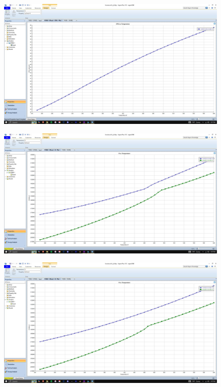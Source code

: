 \documentclass{article}
\begin{document}
\begin{figure}[H]
    \centering
    \includegraphics[width=0.99\textwidth, frame]{img/4.JPG}
\end{figure}

\begin{figure}[H]
    \centering
    \includegraphics[width=0.99\textwidth, frame]{img/5.JPG}
\end{figure}

\begin{figure}[H]
    \centering
    \includegraphics[width=0.99\textwidth, frame]{img/6.JPG}
\end{figure}
\end{document}
